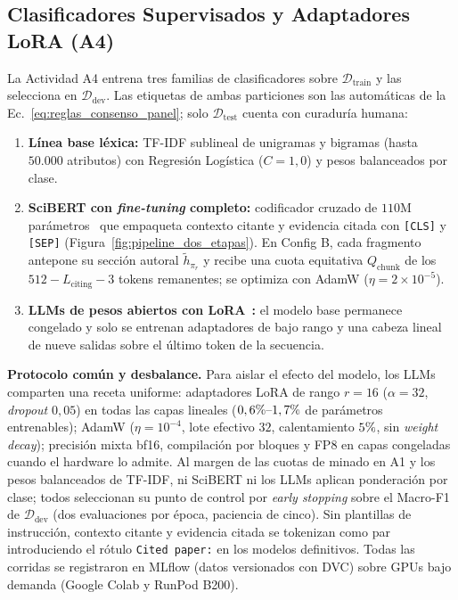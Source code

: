 \documentclass[conference]{IEEEtran}
\newcommand{\pct}{\mbox{\symbol{37}}}
\begin{document}
\subsection{Clasificadores Supervisados y Adaptadores LoRA (A4)}
\label{sec:metodo_a4}

La Actividad A4 entrena tres familias de clasificadores sobre $\mathcal{D}_{\text{train}}$ y las selecciona en $\mathcal{D}_{\text{dev}}$. Las etiquetas de ambas particiones son las automáticas de la Ec.~\eqref{eq:reglas_consenso_panel}; solo $\mathcal{D}_{\text{test}}$ cuenta con curaduría humana:
\begin{enumerate}
    \item \textbf{Línea base léxica:} TF-IDF sublineal de unigramas y bigramas (hasta $50.000$ atributos) con Regresión Logística ($C=1,0$) y pesos balanceados por clase.
    \item \textbf{SciBERT con \textit{fine-tuning} completo:} codificador cruzado de $110\text{M}$ parámetros~\cite{beltagy2019scibert,gu2022local} que empaqueta contexto citante y evidencia citada con \texttt{[CLS]} y \texttt{[SEP]} (Figura~\ref{fig:pipeline_dos_etapas}). En Config B, cada fragmento antepone su sección autoral $\tilde{h}_{\pi_r}$ y recibe una cuota equitativa $Q_{\text{chunk}}$ de los $512 - L_{\text{citing}} - 3$ tokens remanentes; se optimiza con AdamW ($\eta = 2\times 10^{-5}$).
    \item \textbf{LLMs de pesos abiertos con LoRA}~\cite{hu2022lora}\textbf{:} el modelo base permanece congelado y solo se entrenan adaptadores de bajo rango y una cabeza lineal de nueve salidas sobre el último token de la secuencia.
\end{enumerate}

\textbf{Protocolo común y desbalance.} Para aislar el efecto del modelo, los LLMs comparten una receta uniforme: adaptadores LoRA de rango $r=16$ ($\alpha=32$, \textit{dropout} $0,05$) en todas las capas lineales ($0,6\pct{}\text{--}1,7\pct{}$ de parámetros entrenables); AdamW ($\eta = 10^{-4}$, lote efectivo $32$, calentamiento $5\pct{}$, sin \textit{weight decay}); precisión mixta bf16, compilación por bloques y FP8 en capas congeladas cuando el hardware lo admite. Al margen de las cuotas de minado en A1 y los pesos balanceados de TF-IDF, ni SciBERT ni los LLMs aplican ponderación por clase; todos seleccionan su punto de control por \textit{early stopping} sobre el Macro-F1 de $\mathcal{D}_{\text{dev}}$ (dos evaluaciones por época, paciencia de cinco). Sin plantillas de instrucción, contexto citante y evidencia citada se tokenizan como par introduciendo el rótulo \texttt{Cited paper:} en los modelos definitivos. Todas las corridas se registraron en MLflow (datos versionados con DVC) sobre GPUs bajo demanda (Google Colab y RunPod B200).
\end{document}

